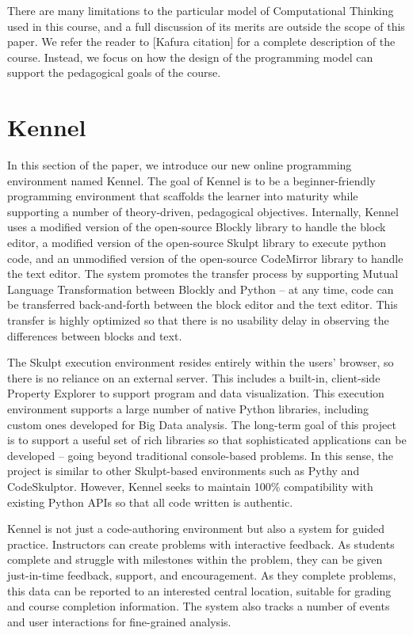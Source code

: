 \documentclass{sig-alternate}
\begin{document}
There are many limitations to the particular model of Computational Thinking used in this course, and a full discussion of its merits are outside the scope of this paper. We refer the reader to [Kafura citation] for a complete description of the course. Instead, we focus on how the design of the programming model can support the pedagogical goals of the course.

\section{Kennel}

In this section of the paper, we introduce our new online programming environment named Kennel.
The goal of Kennel is to be a beginner-friendly programming environment that scaffolds the learner into maturity while supporting a number of theory-driven, pedagogical objectives.
Internally, Kennel uses a modified version of the open-source Blockly library to handle the block editor, a modified version of the open-source Skulpt library to execute python code, and an unmodified version of the open-source CodeMirror library to handle the text editor.
The system promotes the transfer process by supporting Mutual Language Transformation between Blockly and Python -- at any time, code can be transferred back-and-forth between the block editor and the text editor.
This transfer is highly optimized so that there is no usability delay in observing the differences between blocks and text.

The Skulpt execution environment resides entirely within the users' browser, so there is no reliance on an external server. This includes a built-in, client-side Property Explorer to support program and data visualization. This execution environment supports a large number of native Python libraries, including custom ones developed for Big Data analysis. The long-term goal of this project is to support a useful set of rich libraries so that sophisticated applications can be developed -- going beyond traditional console-based problems. In this sense, the project is similar to other Skulpt-based environments such as Pythy and CodeSkulptor. However, Kennel seeks to maintain 100\% compatibility with existing Python APIs so that all code written is authentic.

Kennel is not just a code-authoring environment but also a system for guided practice. Instructors can create problems with interactive feedback. As students complete and struggle with milestones within the problem, they can be given just-in-time feedback, support, and encouragement. As they complete problems, this data can be reported to an interested central location, suitable for grading and course completion information. The system also tracks a number of events and user interactions for fine-grained analysis.
\end{document}
